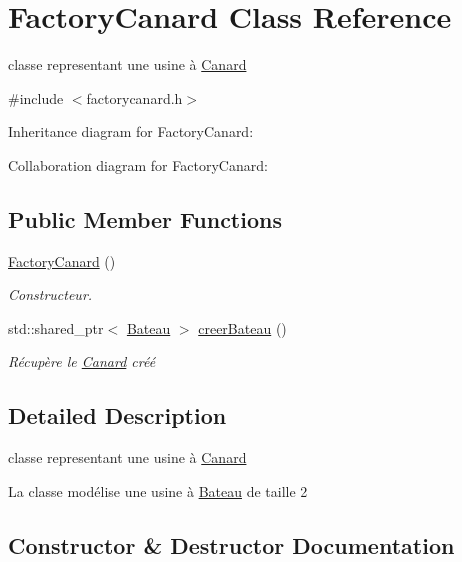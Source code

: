 \hypertarget{class_factory_canard}{}\section{Factory\+Canard Class Reference}
\label{class_factory_canard}


classe representant une usine à \hyperlink{class_canard}{Canard}  




{\ttfamily \#include $<$factorycanard.\+h$>$}



Inheritance diagram for Factory\+Canard\+:


Collaboration diagram for Factory\+Canard\+:
\subsection*{Public Member Functions}
\begin{DoxyCompactItemize}
\item 
\hyperlink{class_factory_canard_a3f272dfd46acb1b14900cc9f6c30a02a}{Factory\+Canard} ()
\begin{DoxyCompactList}\small\item\em Constructeur. \end{DoxyCompactList}\item 
std\+::shared\+\_\+ptr$<$ \hyperlink{class_bateau}{Bateau} $>$ \hyperlink{class_factory_canard_a3ef0d9a9c293006fb09fd03a911a1377}{creer\+Bateau} ()
\begin{DoxyCompactList}\small\item\em Récupère le \hyperlink{class_canard}{Canard} créé \end{DoxyCompactList}\end{DoxyCompactItemize}


\subsection{Detailed Description}
classe representant une usine à \hyperlink{class_canard}{Canard} 

La classe modélise une usine à \hyperlink{class_bateau}{Bateau} de taille 2 

\subsection{Constructor \& Destructor Documentation}
